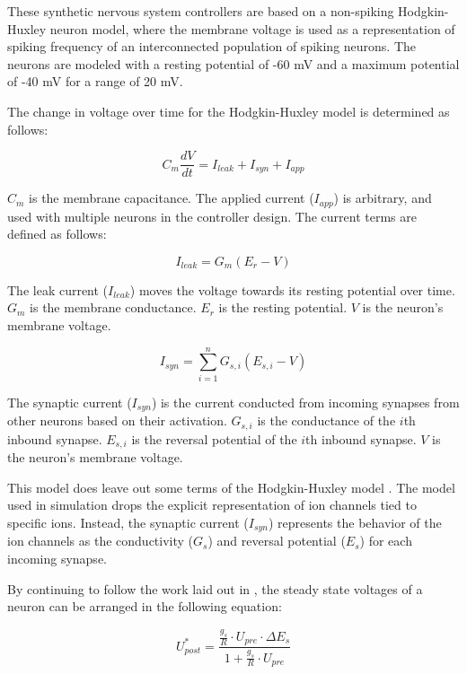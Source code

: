 These synthetic nervous system controllers are based on a non-spiking Hodgkin-Huxley neuron model, where the membrane voltage is used as a representation of spiking frequency of an interconnected population of spiking neurons. The neurons are modeled with a resting potential of -60 mV and a maximum potential of -40 mV for a range of 20 mV.

The change in voltage over time for the Hodgkin-Huxley model is determined as follows:

\begin{equation}
C_{m} \dfrac{d V}{d t} = I_{leak} + I_{syn} + I_{app}
\end{equation}

$C_{m}$ is the membrane capacitance.
The applied current ($I_{app}$) is arbitrary, and used with multiple neurons in the controller design.
The current terms are defined as follows:

\begin{equation}
I_{leak} = G_{m} (E_{r} - V)
\end{equation}

The leak current ($I_{leak}$) moves the voltage towards its resting potential over time. $G_{m}$ is the membrane conductance. $E_{r}$ is the resting potential. $V$ is the neuron's membrane voltage.

\begin{equation}
I_{syn} = \sum_{i=1}^{n} G_{s, i} (E_{s, i} - V)
\end{equation}

The synaptic current ($I_{syn}$) is the current conducted from incoming synapses from other neurons based on their activation.
$G_{s, i}$ is the conductance of the $i$th inbound synapse. $E_{s, i}$ is the reversal potential of the $i$th inbound synapse.
$V$ is the neuron's membrane voltage.

This model does leave out some terms of the Hodgkin-Huxley model \cite{gerstner2014neuronal}.
The model used in simulation drops the explicit representation of ion
channels tied to specific ions. Instead, the synaptic current ($I_{syn}$)
represents the behavior of the ion channels as the conductivity ($G_{s}$) and
reversal potential ($E_{s}$) for each incoming synapse.

By continuing to follow the work laid out in \cite{NickFunctionalSubnetwork}, the steady state voltages of a neuron can be arranged in the following equation:

\begin{equation}
U_{post}^{*} = \dfrac{\frac{g_{s}}{R} \cdot U_{pre} \cdot \Delta E_{s}}{1 + \frac{g_{s}}{R} \cdot U_{pre}}
\end{equation}

